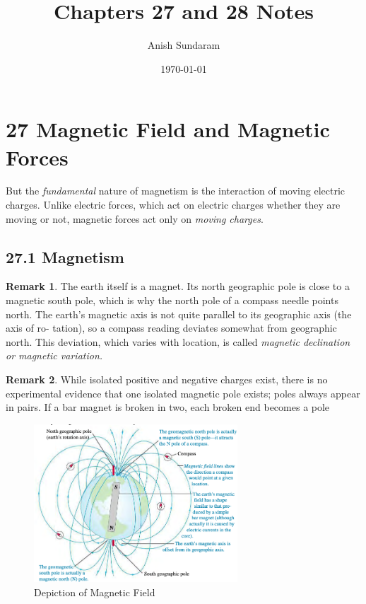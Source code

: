 \documentclass[12pt]{amsart}
\title{Chapters 27 and 28 Notes}
\author{Anish Sundaram}
\date{\today}
\theoremstyle{definition}
\newtheorem*{remark}{Remark}        %
\numberwithin{equation}{theorem}    %
\begin{document}
\maketitle

\tableofcontents

\section*{27 Magnetic Field and Magnetic Forces}

But the \textit{fundamental} nature of magnetism is the interaction of moving 
electric charges. Unlike electric forces, which act on electric charges 
whether they are moving or not, magnetic forces act only on \textit{moving charges}.

\subsection*{27.1 Magnetism}

\begin{remark}
    The earth itself is a magnet. Its north geographic pole is close to a magnetic south pole, which is why the north pole of a compass needle points north. The earth’s magnetic axis is not quite parallel to its geographic axis (the axis of ro- tation), so a compass reading deviates somewhat from geographic north. This deviation, which varies with location, is called \textit{magnetic declination or magnetic variation.}
\end{remark}

\begin{remark}
     While isolated positive and negative charges exist, there is no experimental evidence that one isolated magnetic pole exists; poles always appear in pairs. If a bar magnet is broken in two, each broken end becomes a pole 
\end{remark}

\begin{figure}[H]
    \centering
    \includegraphics[width=3in]{Media/Magnetism.png}
    \caption{Depiction of Magnetic Field}
    \label{Depiction of Magnetic Field}
\end{figure}
\end{document}
